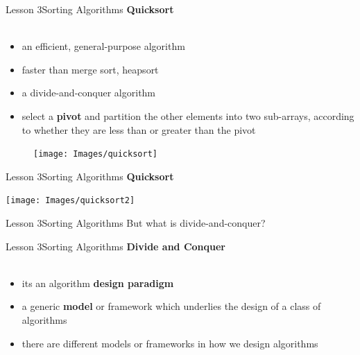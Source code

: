 \documentclass[aspectratio=1610]{beamer}
\begin{document}

\begin{frame}{Lesson 3}{Sorting Algorithms}
\LARGE
\textbf{Quicksort}\\~\\
\begin{minipage}{0.65\textwidth}
\Large
\begin{itemize}
    \item an efficient, general-purpose algorithm
    \item faster than merge sort, heapsort
    \item a \alert{divide-and-conquer} algorithm
    \item select a \textbf{pivot} and partition the other elements into two sub-arrays, according to whether they are less than or greater than the pivot
\end{itemize}
  \end{minipage}
\begin{minipage}{.0\textwidth}
      \begin{figure}
        \texttt{[image: Images/quicksort]}
      \end{figure}
  \end{minipage}  
\end{frame}




\begin{frame}{Lesson 3}{Sorting Algorithms}
\LARGE
\textbf{Quicksort}\\
\begin{center}
\texttt{[image: Images/quicksort2]}
\end{center}
\end{frame}




\begin{frame}{Lesson 3}{Sorting Algorithms}
\Huge
 But what is divide-and-conquer? 
\end{frame}



\begin{frame}{Lesson 3}{Sorting Algorithms}
\LARGE
\textbf{Divide and Conquer}\\~\\
\Large
\begin{itemize}
	\item its an algorithm \textbf{design paradigm}
	\item a generic \textbf{model} or framework which underlies the design of a class of algorithms
	\item there are different models or frameworks in how we design algorithms
\end{itemize}
\end{frame}
\end{document}
